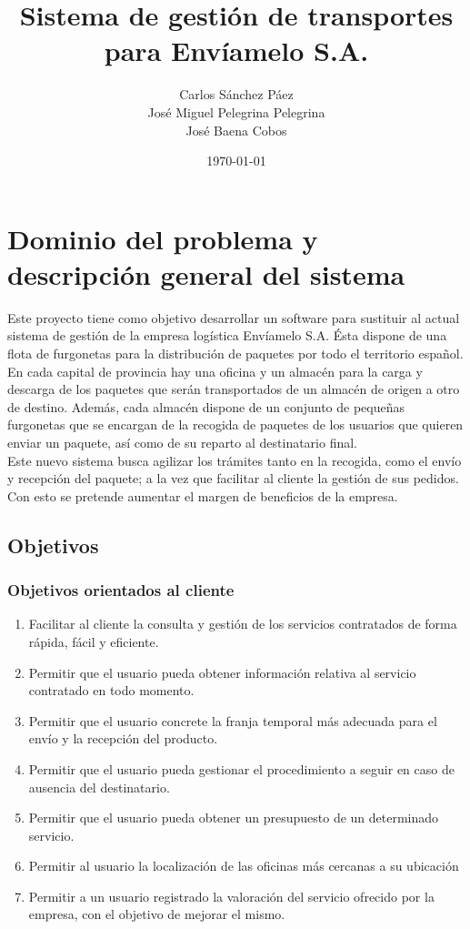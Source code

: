 \documentclass[12pt,spanish]{article}
\title{Sistema de gestión de transportes \\  \small{para Envíamelo S.A.}}
\date{\today}
\author{Carlos Sánchez Páez \\ José Miguel Pelegrina Pelegrina \\ José Baena Cobos}
\begin{document}
\maketitle

\newpage
\tableofcontents
\newpage

\section{Dominio del problema y descripción general del sistema}
Este proyecto tiene como objetivo desarrollar un software para sustituir al actual sistema de gestión de la empresa logística Envíamelo S.A. Ésta dispone de una flota de furgonetas para la distribución de paquetes por todo el territorio español. En cada capital de provincia hay una oficina y un almacén para la carga y descarga de los paquetes que serán transportados de un almacén de origen a otro de destino. Además, cada almacén dispone de un conjunto de pequeñas furgonetas que se encargan de la recogida de paquetes de los usuarios que quieren enviar un paquete, así como de su reparto al destinatario final. \\
Este nuevo sistema busca agilizar los trámites tanto en la recogida, como el envío y recepción del paquete; a la vez que facilitar al cliente la gestión de sus pedidos. Con esto se pretende aumentar el margen de beneficios de la empresa.

\subsection{Objetivos}

\subsubsection{Objetivos orientados al cliente}

\begin{enumerate}[label=\textbf{OBJ-\arabic*}]
	\item Facilitar al cliente la consulta y gestión de los servicios contratados de forma rápida, fácil y eficiente.
	\item Permitir que el usuario pueda obtener información relativa al servicio contratado en todo momento.
	\item Permitir que el usuario concrete la franja temporal más adecuada para el envío y la recepción del producto.
	\item Permitir que el usuario pueda gestionar el procedimiento a seguir en caso de ausencia del destinatario.
	\item Permitir que el usuario pueda obtener un presupuesto de un determinado servicio.
	\item Permitir al usuario la localización de las oficinas más cercanas a su ubicación
	\item Permitir a un usuario registrado la valoración del servicio ofrecido por la empresa, con el objetivo de mejorar el mismo.
\end{enumerate}
\end{document}

